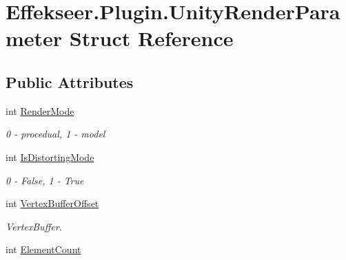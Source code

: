 \hypertarget{struct_effekseer_1_1_plugin_1_1_unity_render_parameter}{\section{Effekseer.\-Plugin.\-Unity\-Render\-Parameter Struct Reference}
\label{struct_effekseer_1_1_plugin_1_1_unity_render_parameter}
}
\subsection*{Public Attributes}
\begin{DoxyCompactItemize}
\item 
\hypertarget{struct_effekseer_1_1_plugin_1_1_unity_render_parameter_a34cdf55ac656016e8daabc19a4fbe136}{int \hyperlink{struct_effekseer_1_1_plugin_1_1_unity_render_parameter_a34cdf55ac656016e8daabc19a4fbe136}{Render\-Mode}}\label{struct_effekseer_1_1_plugin_1_1_unity_render_parameter_a34cdf55ac656016e8daabc19a4fbe136}

\begin{DoxyCompactList}\small\item\em 0 -\/ procedual, 1 -\/ model \end{DoxyCompactList}\item 
\hypertarget{struct_effekseer_1_1_plugin_1_1_unity_render_parameter_afed451d8c0dab6eb27e35eaf6b1a6ac2}{int \hyperlink{struct_effekseer_1_1_plugin_1_1_unity_render_parameter_afed451d8c0dab6eb27e35eaf6b1a6ac2}{Is\-Distorting\-Mode}}\label{struct_effekseer_1_1_plugin_1_1_unity_render_parameter_afed451d8c0dab6eb27e35eaf6b1a6ac2}

\begin{DoxyCompactList}\small\item\em 0 -\/ False, 1 -\/ True \end{DoxyCompactList}\item 
\hypertarget{struct_effekseer_1_1_plugin_1_1_unity_render_parameter_a89524a77b069d3b51e4d83ca18ae3149}{int \hyperlink{struct_effekseer_1_1_plugin_1_1_unity_render_parameter_a89524a77b069d3b51e4d83ca18ae3149}{Vertex\-Buffer\-Offset}}\label{struct_effekseer_1_1_plugin_1_1_unity_render_parameter_a89524a77b069d3b51e4d83ca18ae3149}

\begin{DoxyCompactList}\small\item\em Vertex\-Buffer. \end{DoxyCompactList}\item 
\hypertarget{struct_effekseer_1_1_plugin_1_1_unity_render_parameter_a78295f9a2e8f4d920fc4918484f77df5}{int \hyperlink{struct_effekseer_1_1_plugin_1_1_unity_render_parameter_a78295f9a2e8f4d920fc4918484f77df5}{Element\-Count}}\label{struct_effekseer_1_1_plugin_1_1_unity_render_parameter_a78295f9a2e8f4d920fc4918484f77df5}


\end{DoxyCompactItemize}
